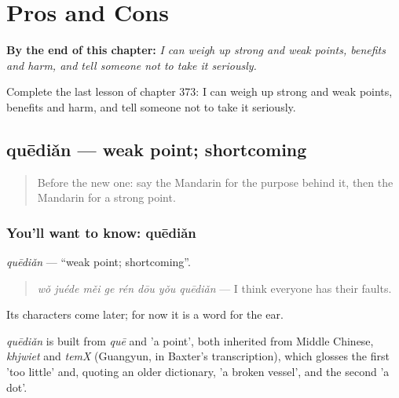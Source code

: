 
\chapter{Pros and Cons}
\label{ch:zh-pros-and-cons}

\begin{chapteropening}
\textbf{By the end of this chapter:} \emph{I can weigh up strong and weak points, benefits and harm, and tell someone not to take it seriously.}

Complete the last lesson of chapter 373: I can weigh up strong and weak points, benefits and harm, and tell someone not to take it seriously.
\end{chapteropening}

\section[quēdiǎn]{quēdiǎn — weak point; shortcoming}

\label{lesson:ZH-C373-quedian}



\begin{quote}
Before the new one: say the Mandarin for the purpose behind it, then the Mandarin for a strong point.
\end{quote}

\subsection*{You'll want to know: quēdiǎn}
\emph{quēdiǎn} — \textquotedblleft{}weak point; shortcoming\textquotedblright{}.

\begin{quote}
\emph{wǒ juéde měi ge rén dōu yǒu quēdiǎn} — I think everyone has their faults.
\end{quote}

Its characters come later; for now it is a word for the ear.

\begin{cousinweb}
\emph{quēdiǎn} is built from \emph{quē} and  'a point', both inherited from Middle Chinese, \emph{khjwiet} and \emph{temX} (Guangyun, in Baxter's transcription), which glosses the first 'too little' and, quoting an older dictionary, 'a broken vessel', and the second 'a dot'.
\end{cousinweb}

